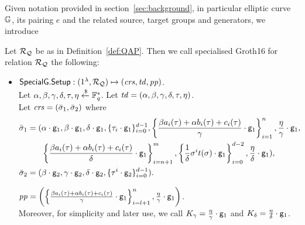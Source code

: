 \noindent Given notation provided in section~\ref{sec:background}, in particular elliptic curve ${\mathbb{G}}$, its pairing $e$ and 
the related source, target groups and generators, we introduce%

\begin{definition}
\label{insta:sg16} Let $\mathcal{R}_{\mathcal{Q}}$ be as in Definition~\ref{def:QAP}. Then we call 
specialised Groth16 for relation $\mathcal{R}_{\mathcal{Q}}$ the following: %
\begin{itemize}
\item ${\mathsf{SpecialG}}.{\mathsf{Setup}}: (1^{\lambda}, \mathcal{R}_{\mathcal{Q}}) \mapsto (\mathit{crs}, \mathit{td},\mathit{pp})$. \\ 
\noindent Let $\alpha, \beta, \gamma, \delta, \tau, \eta  \xleftarrow{\$} \mathbb{F}_q^{*}$. Let $\mathit{td} = (\alpha, \beta, \gamma, \delta, \tau, \eta)$. \\ 
Let $\mathit{crs} = (\bar{\sigma}_1, \bar{\sigma}_2)$ where 
\begin{align*}
\bar{\sigma}_1 = (&\alpha \cdot \mathsf{g}_1, \beta \cdot \mathsf{g}_1, \delta \cdot \mathsf{g}_1, \{\tau_i \cdot \mathsf{g}_1\}_{i=0}^{d-1}, \left\{\frac{\beta a_i(\tau)+ \alpha b_i(\tau)+ c_i(\tau)}{\gamma} \cdot \mathsf{g}_1 \right\}_{i=1}^n,  
\frac{\eta}{\gamma} \cdot \mathsf{g}_1, \\ 
&\left\{\frac{\beta a_i(\tau)+ \alpha b_i(\tau)+ c_i(\tau)}{\delta} \cdot \mathsf{g}_1 \right\}_{i=n+1}^m, \left\{\frac{1}{\delta}\sigma^it(\sigma)\cdot \mathsf{g}_1 \right\}_{i=0}^{d-2}, 
\frac{\eta}{\delta}\cdot \mathsf{g}_1), \\
\bar{\sigma}_2 = (&\beta \cdot \mathsf{g}_2, \gamma \cdot \mathsf{g}_2, \delta \cdot \mathsf{g}_2, \{\tau^i \cdot \mathsf{g}_2\}_{i=0}^{d-1}). 
\end{align*} 

$\mathit{pp} = \left( \left \{ \frac{\beta a_i(\tau)+ \alpha b_i(\tau)+ c_i(\tau)}{\gamma} \cdot \mathsf{g}_1 \right \}_{i=l+1}^{n}, \frac{\eta}{\gamma} \cdot \mathsf{g}_1 \right)$. \\
\noindent Moreover, for simplicity and later use, we call $K_{\gamma} = \frac{\eta}{\gamma} \cdot \mathsf{g}_1$  and $K_{\delta} = \frac{\eta}{\delta} \cdot \mathsf{g}_1$.


\end{itemize}
\end{definition}
